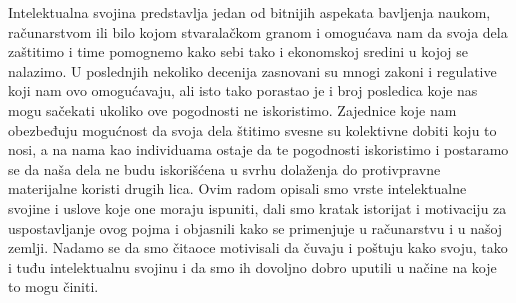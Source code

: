 \documentclass[a4paper]{article}
\begin{document}
Intelektualna svojina predstavlja jedan od bitnijih aspekata bavljenja naukom, računarstvom ili bilo kojom stvaralačkom granom i omogućava nam da svoja dela zaštitimo i time pomognemo kako sebi tako i ekonomskoj sredini u kojoj se nalazimo. U poslednjih nekoliko decenija zasnovani su mnogi zakoni i regulative koji nam ovo omogućavaju, ali isto tako porastao je i broj posledica koje nas mogu sačekati ukoliko ove pogodnosti ne iskoristimo. Zajednice koje nam obezbeđuju mogućnost da svoja dela štitimo svesne su kolektivne dobiti koju to nosi, a na nama kao individuama ostaje da te pogodnosti iskoristimo i postaramo se da naša dela ne budu iskorišćena u svrhu dolaženja do protivpravne materijalne koristi drugih lica. Ovim radom opisali smo vrste intelektualne svojine i uslove koje one moraju ispuniti, dali smo kratak istorijat i motivaciju za uspostavljanje ovog pojma i objasnili kako se primenjuje u računarstvu i u našoj zemlji. Nadamo se da smo čitaoce motivisali da čuvaju i poštuju kako svoju, tako i tuđu intelektualnu svojinu i da smo ih dovoljno dobro uputili u načine na koje to mogu činiti.

\appendix
 

\end{document}
